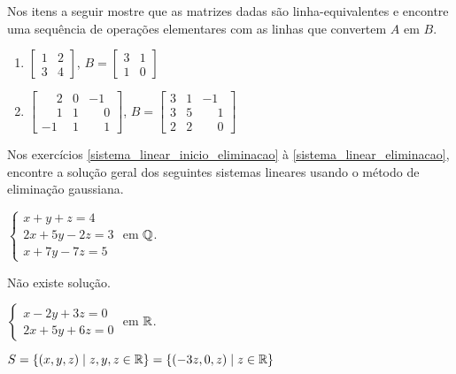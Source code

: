 \documentclass[12pt]{exam}
\begin{document}
\begin{exercicio}
  Nos itens a seguir mostre que as matrizes dadas são linha-equivalentes e encontre uma sequência de operações elementares com as
  linhas que convertem $A$ em $B$.
  \begin{enumerate}[label={\alph*})]
    \item $\begin{bmatrix}1 & 2\\3 & 4\end{bmatrix}$, $B = \begin{bmatrix}3 & 1\\1 & 0\end{bmatrix}$
    \item $\begin{bmatrix}\phantom{-} 2 & 0 & -1\\\phantom{-} 1 & 1 & \phantom{-} 0\\-1 & 1 & \phantom{-} 1\end{bmatrix}$,
      $B = \begin{bmatrix}3 & 1 & -1\\3 & 5 & \phantom{-} 1\\2 & 2 & \phantom{-} 0\end{bmatrix}$
  \end{enumerate}
\end{exercicio}

Nos exercícios \ref{sistema_linear_inicio_eliminacao} à \ref{sistema_linear_eliminacao}, encontre a solução geral dos seguintes sistemas lineares usando o método de eliminação gaussiana.
\begin{exercicio}\label{sistema_linear_inicio_eliminacao}
  $
    \begin{cases}
      x + y + z = 4\\
      2x + 5y - 2z = 3\\
      x + 7y - 7z = 5
    \end{cases}
  $
  em $\mathbb{Q}$.
  \begin{solucao}
    Não existe solução.
  \end{solucao}
\end{exercicio}

\begin{exercicio}
  $
    \begin{cases}
      x - 2y + 3z = 0\\
      2x + 5y + 6z = 0
    \end{cases}
  $
  em $\mathbb{R}$.
  \begin{solucao}
    $S = \{(x, y, z) \mid z, y, z \in \mathbb{R}\} = \{(-3z, 0, z) \mid z \in \mathbb{R}\}$
  \end{solucao}
\end{exercicio}
\end{document}
